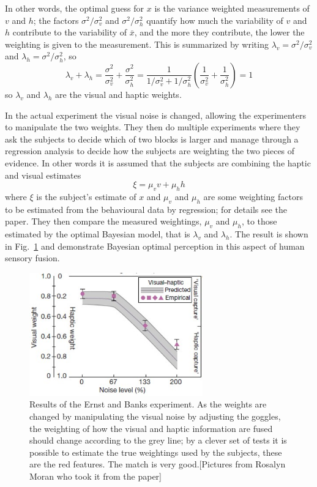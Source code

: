 \documentclass[12pt]{article}
\begin{document}
In other words, the optimal guess for $x$ is the variance weighted
measurements of $v$ and $h$; the factors $\sigma^2/\sigma_v^2$ and
$\sigma^2/\sigma_h^2$ quantify how much the variability of $v$ and $h$
contribute to the variability of $\bar{x}$, and the more they
contribute, the lower the weighting is given to the measurement. This
is summarized by writing $\lambda_v=\sigma^2/\sigma_v^2$ and
$\lambda_h=\sigma^2/\sigma_h^2$, so
\begin{equation}
\lambda_v+\lambda_h=\frac{\sigma^2}{\sigma_v^2}+\frac{\sigma^2}{\sigma_h^2}=\frac{1}{1/\sigma_v^2+1/\sigma_h^2}\left(\frac{1}{\sigma_v^2}+\frac{1}{\sigma_h^2}\right)=1
\end{equation}
so $\lambda_v$ and $\lambda_h$ are the visual and haptic weights.

In the actual experiment the visual noise is changed, allowing the
experimenters to manipulate the two weights. They then do multiple
experiments where they ask the subjects to decide which of two blocks
is larger and manage through a regression analysis to decide how the
subjects are weighting the two pieces of evidence. In other words it is assumed that the subjects are combining the haptic and visual estimates
\begin{equation}
\xi=\mu_v v+\mu_h h
\end{equation}
where $\xi$ is the subject's estimate of $x$ and $\mu_v$ and $\mu_h$
are some weighting factors to be estimated from the behavioural data
by regression; for details see the paper. They then compare the
measured weightings, $\mu_v$ and $\mu_h$, to those estimated by the
optimal Bayesian model, that is $\lambda_v$ and $\lambda_h$. The
result is shown in Fig.~\ref{fig_weights} and demonstrate Bayesian
optimal perception in this aspect of human sensory fusion.


\begin{figure}[htb]
\begin{center}
\includegraphics[width=7.5cm]{fig_weights.png}
\end{center}
\caption{Results of the Ernst and Banks experiment. As the weights are
  changed by manipulating the visual noise by adjusting the goggles,
  the weighting of how the visual and haptic information are fused
  should change according to the grey line; by a clever set of tests
  it is possible to estimate the true weightings used by the subjects,
  these are the red features. The match is very good.[Pictures from
    Rosalyn Moran who took it from the paper]\label{fig_weights}}
\end{figure}


{}
\end{document}
